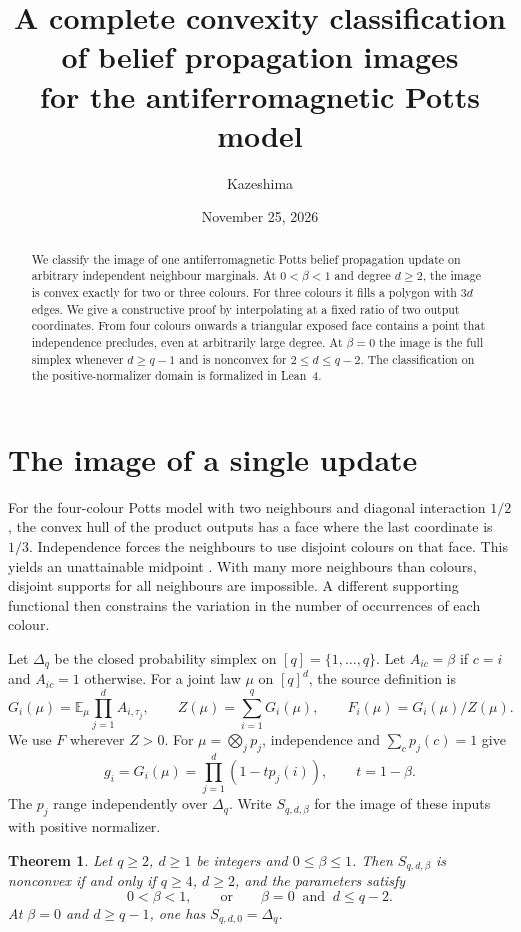 \documentclass[11pt,reqno]{amsart}
\title[Convexity of Potts belief propagation images]{A complete convexity classification\\of belief propagation images\\for the antiferromagnetic Potts model}
\author{Kazeshima}
\date{November 25, 2026}
\newtheorem{theorem}{Theorem}
\newcommand{\Sbp}{S_{q,d,\beta}}
\newcommand{\E}{\mathbb E}
\begin{document}
\begin{abstract}
We classify the image of one antiferromagnetic Potts belief propagation update on arbitrary independent neighbour marginals. At $0<\beta<1$ and degree $d\ge2$, the image is convex exactly for two or three colours. For three colours it fills a polygon with $3d$ edges. We give a constructive proof by interpolating at a fixed ratio of two output coordinates. From four colours onwards a triangular exposed face contains a point that independence precludes, even at arbitrarily large degree. At $\beta=0$ the image is the full simplex whenever $d\ge q-1$ and is nonconvex for $2\le d\le q-2$. The classification on the positive-normalizer domain is formalized in Lean~4.
\end{abstract}
\maketitle

\section{The image of a single update}

For the four-colour Potts model with two neighbours and diagonal interaction $1/2$, the convex hull of the product outputs has a face where the last coordinate is $1/3$. Independence forces the neighbours to use disjoint colours on that face. This yields an unattainable midpoint \cite{Short}. With many more neighbours than colours, disjoint supports for all neighbours are impossible. A different supporting functional then constrains the variation in the number of occurrences of each colour.

Let $\Delta_q$ be the closed probability simplex on $[q]=\{1,\ldots,q\}$. Let $A_{ic}=\beta$ if $c=i$ and $A_{ic}=1$ otherwise. For a joint law $\mu$ on $[q]^d$, the source definition \cite[eqs.~(1)--(2)]{LMP} is
\[
 G_i(\mu)=\E_\mu\prod_{j=1}^d A_{i,\tau_j},\qquad
 Z(\mu)=\sum_{i=1}^qG_i(\mu),\qquad F_i(\mu)=G_i(\mu)/Z(\mu).
\]
We use $F$ wherever $Z>0$. For $\mu=\bigotimes_j p_j$, independence and $\sum_c p_j(c)=1$ give
\begin{equation}\label{eq:product}
 g_i=G_i(\mu)=\prod_{j=1}^{d}(1-tp_j(i)),\qquad t=1-\beta .
\end{equation}
The $p_j$ range independently over $\Delta_q$. Write $\Sbp$ for the image of these inputs with positive normalizer.

\begin{theorem}\label{thm:main}
Let $q\ge2$, $d\ge1$ be integers and $0\le\beta\le1$. Then $\Sbp$ is nonconvex if and only if $q\ge4$, $d\ge2$, and the parameters satisfy
\[
   0<\beta<1,\qquad\text{or}\qquad \beta=0\ \text{ and }\ d\le q-2.
\]
At $\beta=0$ and $d\ge q-1$, one has $S_{q,d,0}=\Delta_q$.
\end{theorem}
\end{document}
